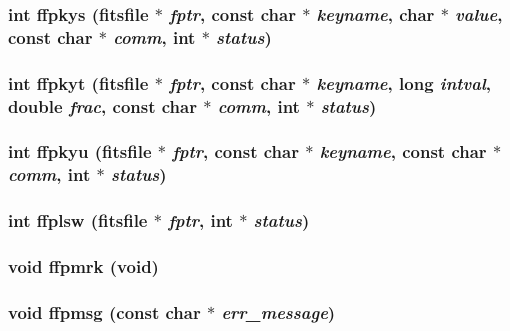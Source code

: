 \subsubsection{\setlength{\rightskip}{0pt plus 5cm}int ffpkys (\bf{fitsfile} $\ast$ {\em fptr}, const char $\ast$ {\em keyname}, char $\ast$ {\em value}, const char $\ast$ {\em comm}, int $\ast$ {\em status})}\label{fitsio_8h_3d860f3d7031a0ba399a769045eda878}


\subsubsection{\setlength{\rightskip}{0pt plus 5cm}int ffpkyt (\bf{fitsfile} $\ast$ {\em fptr}, const char $\ast$ {\em keyname}, long {\em intval}, double {\em frac}, const char $\ast$ {\em comm}, int $\ast$ {\em status})}\label{fitsio_8h_002c4753bb2fe0d01f18b7d920eaa8e6}


\subsubsection{\setlength{\rightskip}{0pt plus 5cm}int ffpkyu (\bf{fitsfile} $\ast$ {\em fptr}, const char $\ast$ {\em keyname}, const char $\ast$ {\em comm}, int $\ast$ {\em status})}\label{fitsio_8h_f93e8090a4a84d3fdb98b798e9a454a8}


\subsubsection{\setlength{\rightskip}{0pt plus 5cm}int ffplsw (\bf{fitsfile} $\ast$ {\em fptr}, int $\ast$ {\em status})}\label{fitsio_8h_961af8c215ce5bb2d2d74ba7d5b02591}


\subsubsection{\setlength{\rightskip}{0pt plus 5cm}void ffpmrk (void)}\label{fitsio_8h_b9700796363d20498ceec03ad6c3b976}


\subsubsection{\setlength{\rightskip}{0pt plus 5cm}void ffpmsg (const char $\ast$ {\em err\_\-message})}\label{fitsio_8h_9db26b27c3c6d7589c44565df739c3d5}


